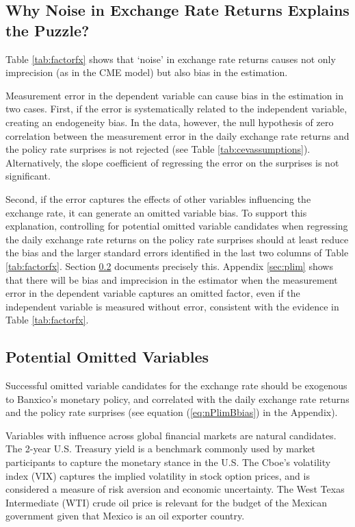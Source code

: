 \sectitlespace
\subsection{Why Noise in Exchange Rate Returns Explains the Puzzle?}
\sectitlespace
Table \ref{tab:factorfx} shows that `noise’ in exchange rate returns causes not only imprecision (as in the CME model) but also bias in the estimation. 

Measurement error in the dependent variable can cause bias in the estimation in two cases. First, if the error is systematically related to the independent variable, creating an endogeneity bias. In the data, however, the null hypothesis of zero correlation between the measurement error in the daily exchange rate returns and the policy rate surprises is not rejected (see Table \ref{tab:cevassumptions}). Alternatively, the slope coefficient of regressing the error on the surprises is not significant. 

Second, if the error captures the effects of other variables influencing the exchange rate, it can generate an omitted variable bias. To support this explanation, controlling for potential omitted variable candidates when regressing the daily exchange rate returns on the policy rate surprises should at least reduce the bias and the larger standard errors identified in the last two columns of Table \ref{tab:factorfx}. Section \ref{sec:omittedvar} documents precisely this. 
Appendix \ref{sec:plim} shows that there will be bias and imprecision in the estimator when the measurement error in the dependent variable captures an omitted factor, even if the independent variable is measured without error, consistent with the evidence in Table \ref{tab:factorfx}.

\sectitlespace
\subsection{Potential Omitted Variables} \label{sec:omittedvar}
\sectitlespace
Successful omitted variable candidates for the exchange rate should be exogenous to Banxico's monetary policy, and correlated with the daily exchange rate returns and the policy rate surprises (see equation (\ref{eq:nPlimBbias}) in the Appendix). 

Variables with influence across global financial markets are natural candidates. The 2-year U.S. Treasury yield is a benchmark commonly used by market participants to capture the monetary stance in the U.S. 
The Cboe's volatility index (VIX) captures the implied volatility in stock option prices, and is considered a measure of risk aversion and economic uncertainty. The West Texas Intermediate (WTI) crude oil price is relevant for the budget of the Mexican government given that Mexico is an oil exporter country.

